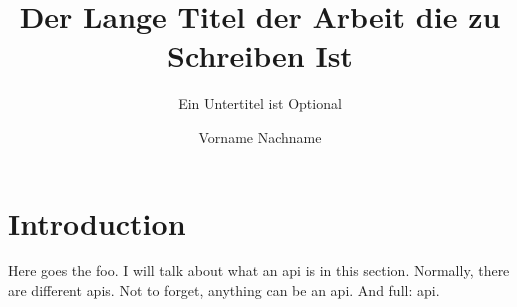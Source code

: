 \documentclass[draft,master]{swathesis}
\author{Vorname Nachname}
\title{Der Lange Titel der Arbeit die zu Schreiben Ist}
\subtitle{Ein Untertitel ist Optional}
\begin{document}
\frontmatter
\maketitle


\tableofcontents
\listoffigures
\listoftables
\lstlistoflistings
\listofacronyms %
\mainmatter
% 
% 
% 
% 
% 
% 
% 
%


\chapter{Introduction}
\label{cha:introduction}

\blindtext
\cite{Kay:2011:PCC:800193.1971922}




Here goes the foo.
I will talk about what an \ac{api} is in this section.
Normally, there are different \acp{api}. Not to forget,
anything can be an \ac{api}. And full: \acf{api}.

\blinddocument

\printbibliography
\clearpage
\appendix

\backmatter
\markboth{}\relax
{}
\end{document}
